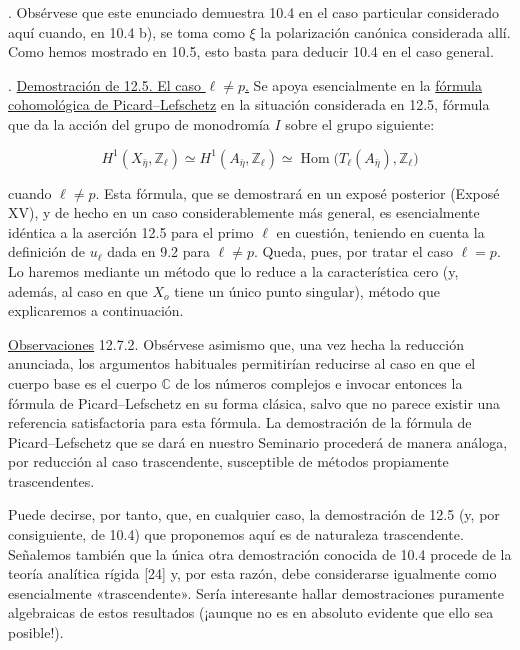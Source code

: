 

\medskip
{}. Obsérvese que este enunciado demuestra 10.4 en el caso particular
considerado aquí cuando, en 10.4 b), se toma como $\xi$ la polarización
canónica considerada allí. Como hemos mostrado en 10.5, esto basta para
deducir 10.4 en el caso general.

\medskip
{}. \underline{Demostración de 12.5. El caso $\ell\ne p$.} Se apoya
esencialmente en la \underline{fórmula cohomológica de
Picard--Lefschetz} en la situación considerada en 12.5, fórmula que da la
acción del grupo de monodromía $I$ sobre el grupo siguiente:

\begin{equation}\tag{12.7.1}
 H^1(X_{\bar\eta},\mathbb Z_\ell)
 \simeq H^1(A_{\bar\eta},\mathbb Z_\ell)
 \simeq\operatorname{Hom}
   \bigl(T_\ell(A_{\bar\eta}),\mathbb Z_\ell\bigr)
\end{equation}

\noindent
cuando $\ell\ne p$. Esta fórmula, que se demostrará en un exposé
posterior (Exposé XV), y de hecho en un caso considerablemente más
general, es esencialmente idéntica a la aserción 12.5 para el primo
$\ell$ en cuestión, teniendo en cuenta la definición de $u_\ell$ dada en
9.2 para $\ell\ne p$. Queda, pues, por tratar el caso $\ell=p$. Lo
haremos mediante un método que lo reduce a la característica cero (y,
además, al caso en que $X_o$ tiene un único punto singular), método que
explicaremos a continuación.


\medskip
\noindent
\underline{Observaciones} 12.7.2. Obsérvese asimismo que, una vez hecha
la reducción anunciada, los argumentos habituales permitirían reducirse
al caso en que el cuerpo base es el cuerpo $\mathbb C$ de los números
complejos e invocar entonces la fórmula de Picard--Lefschetz en su forma
clásica, salvo que no parece existir una referencia satisfactoria para
esta fórmula. La demostración de la fórmula de Picard--Lefschetz que se
dará en nuestro Seminario procederá de manera análoga, por reducción al
caso trascendente, susceptible de métodos propiamente trascendentes.


Puede decirse, por tanto, que, en cualquier caso, la demostración de 12.5
(y, por consiguiente, de 10.4) que proponemos aquí es de naturaleza
trascendente. Señalemos también que la única otra demostración conocida
de 10.4 procede de la teoría analítica rígida [24] y, por esta razón,
debe considerarse igualmente como esencialmente «trascendente». Sería
interesante hallar demostraciones puramente algebraicas de estos
resultados (¡aunque no es en absoluto evidente que ello sea posible!).
